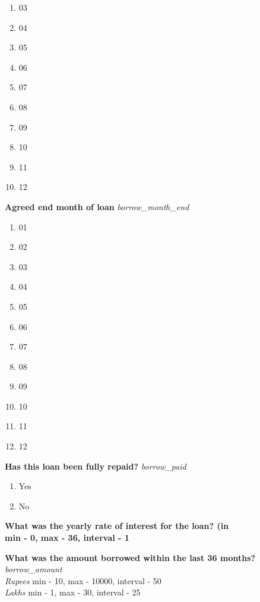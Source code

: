 \documentclass{article}
\begin{document}
\begin{enumerate}
\begin{enumerate}[label*=\arabic*.]
\begin{enumerate}
\item 03
\item 04
\item 05
\item 06
\item 07
\item 08
\item 09
\item 10
\item 11
\item 12
\end{enumerate}
\item {\bfseries Agreed end month of loan}\emph{ borrow\_month\_end }
\begin{enumerate}
\item 01
\item 02
\item 03
\item 04
\item 05
\item 06
\item 07
\item 08
\item 09
\item 10
\item 11
\item 12
\end{enumerate}
\item {\bfseries Has this loan been fully repaid?}\emph{ borrow\_paid }
\begin{enumerate}
\item Yes
\item No
\end{enumerate}
\item {\bfseries What was the yearly rate of interest for the loan? (in %
\\min - 0, max - 36, interval - 1

\item {\bfseries What was the amount borrowed within the last 36 months?}\emph{ borrow\_amount }
\\ \emph{ Rupees }min - 10, max - 10000, interval - 50
\\ \emph{ Lakhs }min - 1, max - 30, interval - 25

}
\end{enumerate}
\end{enumerate}
\end{document}
